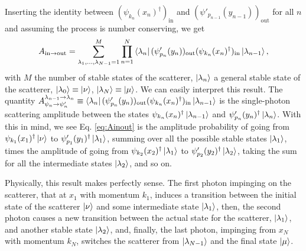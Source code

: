 \documentclass[notitlepage, prx, preprint, amsmath,superscriptaddress,amssymb]{revtex4-1}
\begin{document}
Inserting the identity between $\left(\psi_{k_n}(x_n)^\dagger\right)_\text{in}$ and $\left(\psi'_{p_{n-1}}(y_{n-1})\right)_\text{out}$ for all $n$ and assuming the process is number conserving, we get
\begin{equation}\label{eq:Ainout}
A_{\text{in}\to\text{out}}= \sum_{\lambda_1,\dots,\lambda_{N-1}=1}^M \prod_{n=1}^N \bra{\lambda_n} (\psi'_{p_n}(y_n))_\text{out}(\psi_{k_n}(x_n)^\dagger)_\text{in}\ket{\lambda_{n-1}},
\end{equation}
with $M$ the number of stable states of the scatterer, $\ket{\lambda_n}$ a general stable state of the scatterer, $\ket{\lambda_0}\equiv \ket{\nu}$, $\ket{\lambda_N}\equiv \ket{\mu}$. We can easily interpret this result. The quantity $A_{\psi_n\to\psi'_n}^{\lambda_{n-1}\to\lambda_n} \equiv \bra{\lambda_n} (\psi'_{p_n}(y_n))_\text{out}(\psi_{k_n}(x_n)^\dagger)_\text{in}\ket{\lambda_{n-1}}$ is the single-photon scattering amplitude between the states $\psi_{k_n}(x_n)^\dagger\ket{\lambda_{n-1}}$ and $\psi'_{p_n}(y_n)^\dagger\ket{\lambda_n}$. With this in mind, we see Eq. \eqref{eq:Ainout} is the amplitude probability of going from $\psi_{k_1}(x_1)^\dagger\ket{\nu}$ to $\psi'_{p_1}(y_1)^\dagger\ket{\lambda_1}$, summing over all the possible stable states $\ket{\lambda_1}$, times the amplitude of going from $\psi_{k_2}(x_2)^\dagger\ket{\lambda_1}$ to $\psi'_{p_2}(y_2)^\dagger\ket{\lambda_2}$, taking the sum for all the intermediate states $\ket{\lambda_2}$, and so on.

Physically, this result makes perfectly sense. The first photon impinging on the scatterer, that at $x_1$ with momentum $k_1$, induces a transition between the initial state of the scatterer $\ket{\nu}$ and some intermediate state $\ket{\lambda_1}$, then, the second photon causes a new transition between the actual state for the scatterer, $\ket{\lambda_1}$, and another stable state $\ket{\lambda_2}$, and, finally, the last photon, impinging from $x_N$ with momentum $k_N$, switches the scatterer from $\ket{\lambda_{N-1}}$ and the final state $\ket{\mu}$.
\end{document}
